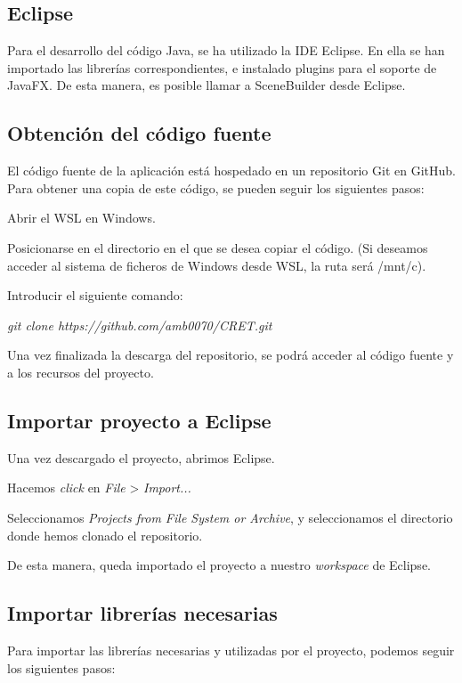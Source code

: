 
\subsection{Eclipse}

Para el desarrollo del código Java, se ha utilizado la IDE Eclipse. En ella se han importado las librerías correspondientes, e instalado plugins para el soporte de JavaFX. De esta manera, es posible llamar a SceneBuilder desde Eclipse.


\subsection{Obtención del código fuente}

El código fuente de la aplicación está hospedado en un repositorio Git en GitHub. Para obtener una copia de este código, se pueden seguir los siguientes pasos:

Abrir el WSL en Windows.

Posicionarse en el directorio en el que se desea copiar el código. (Si deseamos acceder al sistema de ficheros de Windows desde WSL, la ruta será /mnt/c).

Introducir el siguiente comando:

\textit{git clone https://github.com/amb0070/CRET.git}

Una vez finalizada la descarga del repositorio, se podrá acceder al código fuente y a los recursos del proyecto.

\subsection{Importar proyecto a Eclipse}

Una vez descargado el proyecto, abrimos Eclipse.

Hacemos \emph{click} en \emph{File} > \emph{Import...}

Seleccionamos \emph{Projects from File System or Archive}, y seleccionamos el directorio donde hemos clonado el repositorio.

De esta manera, queda importado el proyecto a nuestro \emph{workspace} de Eclipse.


\subsection{Importar librerías necesarias}

Para importar las librerías necesarias y utilizadas por el proyecto, podemos seguir los siguientes pasos:

